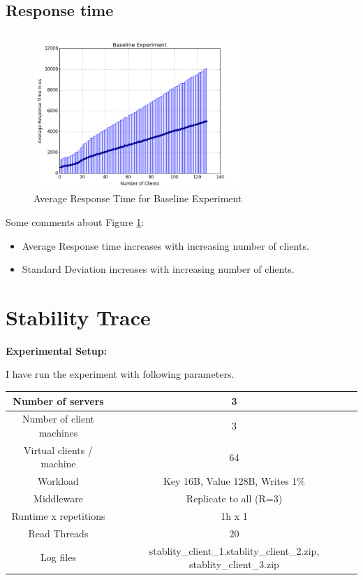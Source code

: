 \documentclass[11pt]{article}
\begin{document}
\subsection{Response time}\label{sec:baseline:rt}

\begin{figure}[h!]
    \centering
    \includegraphics[width=0.7\textwidth]{base_avg.png}
    \caption{Average Response Time for Baseline Experiment}
    \label{fig:basea}
\end{figure}

Some comments about Figure \ref{fig:basea}:
\begin{itemize}
	\item Average Response time increases with increasing number of clients.
	\item Standard Deviation increases with increasing number of clients.
\end{itemize}

\section{Stability Trace}\label{sec:trace}
\textbf{Experimental Setup:}

I have run the experiment with following parameters.

\begin{center}
\small{
\smallskip
\begin{tabular}{|c|c|}
\hline Number of servers & 3 \\ 
\hline Number of client machines & 3 \\ 
\hline Virtual clients / machine &  64 \\ 
\hline Workload & Key 16B, Value 128B, Writes 1\% \\
\hline Middleware & Replicate to all (R=3) \\ 
\hline Runtime x repetitions & 1h x 1 \\ 
\hline Read Threads & 20 \\ 
\hline Log files & stablity\_client\_1.stablity\_client\_2.zip, stablity\_client\_3.zip\\
\hline 
\end{tabular} }
\end{center}
\end{document}

